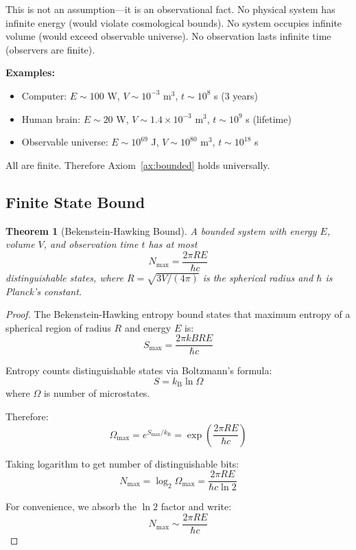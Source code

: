 \documentclass[twocolumn,10pt]{article}
\newtheorem{theorem}{Theorem}[section]
\theoremstyle{definition}
\theoremstyle{remark}
\newcommand{\kB}{k_{\text{B}}}
\newcommand{\Nmax}{N_{\max}}
\begin{document}
\noindent This is not an assumption—it is an observational fact. No physical system has infinite energy (would violate cosmological bounds). No system occupies infinite volume (would exceed observable universe). No observation lasts infinite time (observers are finite).

\vspace{0.2cm}
\noindent\textbf{Examples:}
\begin{itemize}
\item Computer: $E \sim 100$ W, $V \sim 10^{-3}$ m$^3$, $t \sim 10^8$ s (3 years)
\item Human brain: $E \sim 20$ W, $V \sim 1.4 \times 10^{-3}$ m$^3$, $t \sim 10^9$ s (lifetime)
\item Observable universe: $E \sim 10^{69}$ J, $V \sim 10^{80}$ m$^3$, $t \sim 10^{18}$ s
\end{itemize}

All are finite. Therefore Axiom~\ref{ax:bounded} holds universally.

\subsection{Finite State Bound}

\begin{theorem}[Bekenstein-Hawking Bound]
\label{thm:finite_bound}
A bounded system with energy $E$, volume $V$, and observation time $t$ has at most
\begin{equation}
\Nmax = \frac{2\pi RE}{\hbar c}
\end{equation}
distinguishable states, where $R = \sqrt{3V/(4\pi)}$ is the spherical radius and $\hbar$ is Planck's constant.
\end{theorem}

\begin{proof}
The Bekenstein-Hawking entropy bound\cite{bekenstein1973} states that maximum entropy of a spherical region of radius $R$ and energy $E$ is:
\begin{equation}
S_{\max} = \frac{2\pi kB RE}{\hbar c}
\end{equation}

Entropy counts distinguishable states via Boltzmann's formula\cite{boltzmann1877}:
\begin{equation}
S = \kB \ln \Omega
\end{equation}
where $\Omega$ is number of microstates.

Therefore:
\begin{equation}
\Omega_{\max} = e^{S_{\max}/\kB} = \exp\left(\frac{2\pi RE}{\hbar c}\right)
\end{equation}

Taking logarithm to get number of distinguishable bits:
\begin{equation}
\Nmax = \log_2 \Omega_{\max} = \frac{2\pi RE}{\hbar c \ln 2}
\end{equation}

For convenience, we absorb the $\ln 2$ factor and write:
\begin{equation}
\Nmax \sim \frac{2\pi RE}{\hbar c}
\end{equation}
\end{proof}
\end{document}
